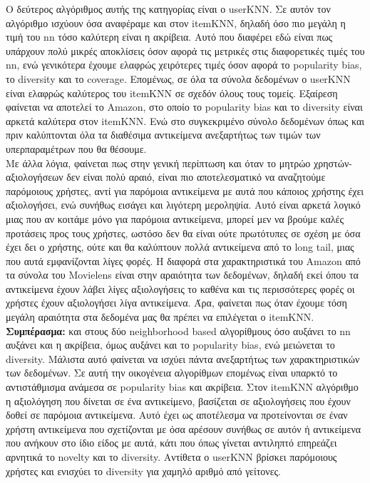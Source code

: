 \noindent Ο δεύτερος αλγόριθμος αυτής της κατηγορίας είναι ο userKNN. Σε αυτόν τον αλγόριθμο ισχύουν όσα αναφέραμε και στον itemKNN, δηλαδή όσο πιο μεγάλη η τιμή του nn τόσο καλύτερη είναι η ακρίβεια. Αυτό που διαφέρει εδώ είναι πως υπάρχουν πολύ μικρές αποκλίσεις όσον αφορά τις μετρικές στις διαφορετικές τιμές του nn, ενώ γενικότερα έχουμε ελαφρώς χειρότερες τιμές όσον αφορά το popularity bias, το diversity και το coverage. 
Επομένως, σε όλα τα σύνολα δεδομένων ο userKNN είναι ελαφρώς καλύτερος του itemKNN σε σχεδόν όλους τους τομείς. Εξαίρεση φαίνεται να αποτελεί το Amazon, στο οποίο το popularity bias και το diversity είναι αρκετά καλύτερα στον itemKNN. Ενώ στο συγκεκριμένο σύνολο δεδομένων όπως και πριν καλύπτονται όλα τα διαθέσιμα αντικείμενα ανεξαρτήτως των τιμών των υπερπαραμέτρων που θα θέσουμε. \\
Με άλλα λόγια, φαίνεται πως στην γενική περίπτωση και όταν το μητρώο χρηστών-αξιολογήσεων δεν είναι πολύ αραιό, είναι πιο αποτελεσματικό να αναζητούμε παρόμοιους χρήστες, αντί για παρόμοια αντικείμενα με αυτά που κάποιος χρήστης έχει αξιολογήσει, ενώ συνήθως εισάγει και λιγότερη μεροληψία. Αυτό είναι αρκετά λογικό μιας που αν κοιτάμε μόνο για παρόμοια αντικείμενα, μπορεί μεν να βρούμε καλές προτάσεις προς τους χρήστες, ωστόσο δεν θα είναι ούτε πρωτότυπες σε σχέση με όσα έχει δει ο χρήστης, ούτε και θα καλύπτουν πολλά αντικείμενα από το long tail, μιας που αυτά εμφανίζονται λίγες φορές. Η διαφορά στα χαρακτηριστικά του Amazon από τα σύνολα του Movielens είναι στην αραιότητα των δεδομένων, δηλαδή εκεί όπου τα αντικείμενα έχουν λάβει λίγες αξιολογήσεις το καθένα και τις περισσότερες φορές οι χρήστες έχουν αξιολογήσει λίγα αντικείμενα. Άρα, φαίνεται πως όταν έχουμε τόση μεγάλη αραιότητα στα δεδομένα μας θα πρέπει να επιλέγεται ο itemKNN.\\
\textbf{Συμπέρασμα:} και στους δύο neighborhood based αλγορίθμους όσο αυξάνει το nn αυξάνει και η ακρίβεια, όμως αυξάνει και το popularity bias, ενώ μειώνεται το diversity. Μάλιστα αυτό φαίνεται να ισχύει πάντα ανεξαρτήτως των χαρακτηριστικών των δεδομένων. Σε αυτή την οικογένεια αλγορίθμων επομένως είναι υπαρκτό το αντιστάθμισμα ανάμεσα σε popularity bias και ακρίβεια. Στον itemΚΝΝ αλγόριθμο η αξιολόγηση που δίνεται σε ένα αντικείμενο, βασίζεται σε αξιολογήσεις που έχουν δοθεί σε παρόμοια αντικείμενα. Αυτό έχει ως αποτέλεσμα να προτείνονται σε έναν χρήστη αντικείμενα που σχετίζονται με όσα αρέσουν συνήθως σε αυτόν ή αντικείμενα που ανήκουν στο ίδιο είδος με αυτά, κάτι που όπως γίνεται αντιληπτό επηρεάζει αρνητικά το novelty και το diversity. Αντίθετα ο userKNN βρίσκει παρόμοιους χρήστες και ενισχύει το diversity για χαμηλό αριθμό από γείτονες.
\newpage
